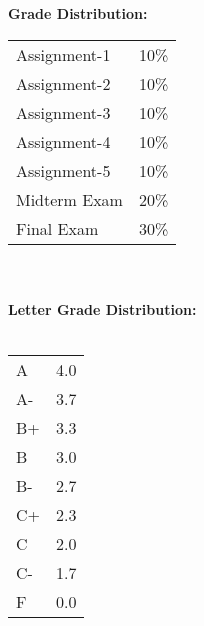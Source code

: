 \documentclass[11pt]{article}
\begin{document}
\textbf {\large Grade Distribution:} \\
\hspace*{40mm}
\begin{tabular}{ l l }
Assignment-1 & 10\% \\
Assignment-2 & 10\% \\
Assignment-3 & 10\% \\
Assignment-4 & 10\% \\
Assignment-5 & 10\% \\
Midterm Exam  & 20\% \\
Final Exam  & 30\%
\end{tabular} \\\\

\textbf {\large Letter Grade Distribution:} \\\\
\hspace*{40mm}
\begin{tabular}{| l | l |}
A  & 4.0	\\
A- & 3.7	\\
B+ & 3.3	\\
B  & 3.0	\\
B- & 2.7	\\
C+ & 2.3	\\
C & 2.0		\\
C- & 1.7	\\
F & 0.0		\\
\end{tabular} \\
\end{document}
